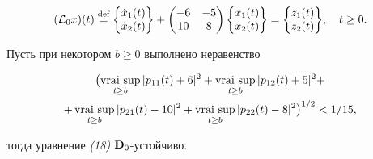 $$


({\cal L}_0x)(t) \eqdef


\biggl\{


\begin{matrix}


\Dot x_1(t)\\


\Dot x_2(t)


\end{matrix}


\biggr\} +


\begin{pmatrix}


-6 &-5\\


10 & 8


\end{pmatrix}


\biggl\{


\begin{matrix}


{x}_1(t)\\


{x}_2(t)


\end{matrix}


\biggr\} =


\biggl\{


\begin{matrix}


z_1(t)\\


z_2(t)


\end{matrix}


\biggr\}, \quad t\ge 0.


$$





\begin{priz} Пусть при некотором $b\ge 0$ выполнено неравенство


\begin{multline*}


\bigl(\vraisup_{t\ge b}|p_{11}(t)+6|^2+\vraisup_{t\ge b}|p_{12}(t)+5|^2 +\\


+\vraisup_{t\ge b}|p_{21}(t)-10|^2+\vraisup_{t\ge b}|p_{22}(t)-8|^2\bigr)^{1/2}


<1/15,


\end{multline*}


тогда уравнение {\em (18)} $\bold D_0$-устойчиво.


\end{priz}





